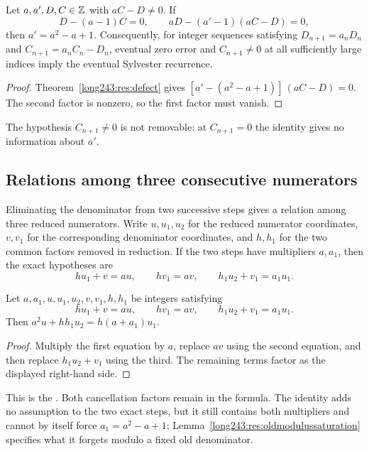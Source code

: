 \documentclass[11pt]{article}
\begin{document}
\begin{theorem}\label{long243:res:step}
Let $a,a',D,C\in\mathbb{Z}$ with $aC-D\ne0$. If
\[
 D-(a-1)C=0,\qquad aD-(a'-1)(aC-D)=0,
\]
then $a'=a^2-a+1$.
Consequently, for integer sequences satisfying
$D_{n+1}=a_nD_n$ and $C_{n+1}=a_nC_n-D_n$, eventual zero error and
$C_{n+1}\ne0$ at all sufficiently large indices imply the eventual
Sylvester recurrence.
\end{theorem}

\begin{proof}
Theorem~\ref{long243:res:defect} gives
$[a'-(a^2-a+1)]\,(aC-D)=0$. The second factor is nonzero, so the first
factor must vanish.
\end{proof}

  The hypothesis $C_{n+1}\ne0$ is not removable: at $C_{n+1}=0$
the identity gives no information about $a'$.

\subsection{Relations among three consecutive numerators}

Eliminating the denominator from two successive steps gives a relation
among three reduced numerators.  Write $u,u_1,u_2$ for the
reduced numerator coordinates, $v,v_1$ for the corresponding denominator
coordinates, and $h,h_1$ for the two common factors removed in reduction.  If
the two steps have multipliers $a,a_1$, then the exact hypotheses are
\[
 hu_1+v=au,\qquad hv_1=av,\qquad
 h_1u_2+v_1=a_1u_1.
\]

\begin{theorem}\label{long243:res:secondorder}
Let $a,a_1,u,u_1,u_2,v,v_1,h,h_1$ be integers satisfying
\[
 hu_1+v=au,\qquad hv_1=av,\qquad h_1u_2+v_1=a_1u_1.
\]
Then $a^2u+hh_1u_2=h(a+a_1)u_1$.
\end{theorem}

\begin{proof}
Multiply the first equation by $a$, replace $av$ using the second equation,
and then replace $h_1u_2+v_1$ using the third.  The remaining terms factor as
the displayed right-hand side.
\end{proof}

\noindent This is the
.  Both cancellation factors remain in the formula. The identity adds no
assumption to the two exact steps, but it still contains both multipliers
and cannot by itself force $a_1=a^2-a+1$;
Lemma~\ref{long243:res:oldmodulussaturation} specifies what it forgets
modulo a fixed old denominator.
\end{document}
